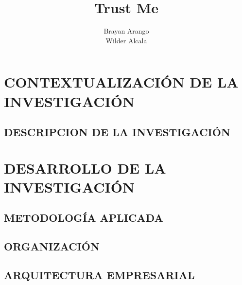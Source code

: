 \documentclass[12pt,letterpaper,oneside]{report}
\title{Trust Me}
\author{{Brayan Arango} \\ {Wilder Alcala}}
\begin{document}
	
	
	

	
	
	
	\tableofcontents
	\listoffigures
	
	
	
	\part{CONTEXTUALIZACIÓN DE LA INVESTIGACIÓN}
	
		\chapter{DESCRIPCION DE LA INVESTIGACIÓN}
			
			
			
			
			
			
			
			
	\part{DESARROLLO DE LA INVESTIGACIÓN}
		
		\chapter{METODOLOGÍA APLICADA}
			
			
			
			
		
		\chapter{ORGANIZACIÓN}
			
			
			
			
			
			
			
			
			
		\chapter{ARQUITECTURA EMPRESARIAL}
			
			
			
\end{document}
